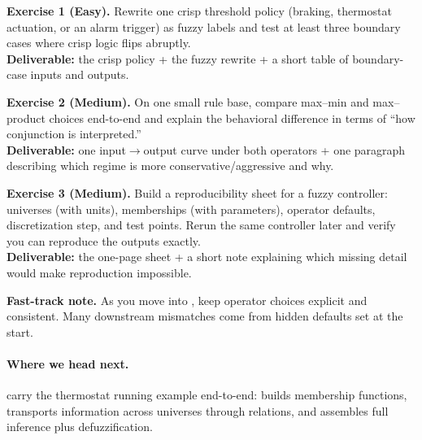 \begin{tcolorbox}[summarybox, title={Exercises}]
\textbf{Exercise 1 (Easy).} Rewrite one crisp threshold policy (braking, thermostat actuation, or an alarm trigger) as fuzzy labels and test at least three boundary cases where crisp logic flips abruptly. \\
\textbf{Deliverable:} the crisp policy + the fuzzy rewrite + a short table of boundary-case inputs and outputs.

\smallskip
\textbf{Exercise 2 (Medium).} On one small rule base, compare max--min and max--product choices end-to-end and explain the behavioral difference in terms of ``how conjunction is interpreted.'' \\
\textbf{Deliverable:} one input\(\rightarrow\)output curve under both operators + one paragraph describing which regime is more conservative/aggressive and why.

\smallskip
\textbf{Exercise 3 (Medium).} Build a reproducibility sheet for a fuzzy controller: universes (with units), memberships (with parameters), operator defaults, discretization step, and test points. Rerun the same controller later and verify you can reproduce the outputs exactly. \\
\textbf{Deliverable:} the one-page sheet + a short note explaining which missing detail would make reproduction impossible.

\medskip
\noindent\textbf{Fast-track note.} As you move into , keep operator choices explicit and consistent. Many downstream mismatches come from hidden defaults set at the start.
\end{tcolorbox}

\paragraph{Where we head next.}  carry the thermostat running example end-to-end:  builds membership functions,  transports information across universes through relations, and  assembles full inference plus defuzzification.

\nocite{Zadeh1965, DuboisPrade1980, YenLangari1999}
